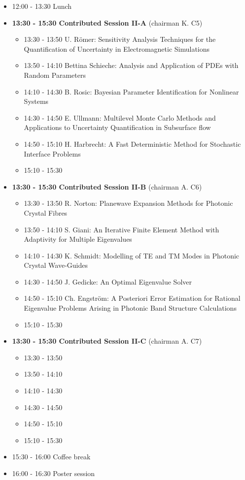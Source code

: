 \documentclass[10pt, A4]{article}%
\begin{document}
\begin{itemize}
\begin{itemize}
  \end{itemize}
  \item 12:00 - 13:30 Lunch
  \item {\bf 13:30 - 15:30 Contributed Session II-A} (chairman K. C5) 
  \begin{itemize}
    \item 13:30 - 13:50 U. R\"{o}mer: Sensitivity Analysis Techniques for the Quantification of Uncertainty in Electromagnetic Simulations
    \item 13:50 - 14:10 Bettina Schieche: Analysis and Application of PDEs with Random Parameters
    \item 14:10 - 14:30 B. Rosic: Bayesian Parameter Identification for Nonlinear Systems
    \item 14:30 - 14:50 E. Ullmann: Multilevel Monte Carlo Methods and Applications to Uncertainty Quantification in Subsurface flow
    \item 14:50 - 15:10 H. Harbrecht: A Fast Deterministic Method for Stochastic Interface Problems
    \item 15:10 - 15:30
  \end{itemize}
  \item {\bf 13:30 - 15:30 Contributed Session II-B} (chairman A. C6) 
  \begin{itemize}
    \item 13:30 - 13:50 R. Norton: Planewave Expansion Methods for Photonic Crystal Fibres
    \item 13:50 - 14:10 S. Giani: An Iterative Finite Element Method with Adaptivity for Multiple Eigenvalues
    \item 14:10 - 14:30 K. Schmidt: Modelling of TE and TM Modes in Photonic Crystal Wave-Guides
    \item 14:30 - 14:50 J. Gedicke: An Optimal Eigenvalue Solver
    \item 14:50 - 15:10 Ch. Engstr\"{o}m: A Posteriori Error Estimation for Rational Eigenvalue Problems Arising in Photonic Band Structure Calculations
    \item 15:10 - 15:30
  \end{itemize}
    \item {\bf 13:30 - 15:30 Contributed Session II-C} (chairman A. C7) 
  \begin{itemize}
    \item 13:30 - 13:50 
    \item 13:50 - 14:10 
    \item 14:10 - 14:30 
    \item 14:30 - 14:50 
    \item 14:50 - 15:10
    \item 15:10 - 15:30 
  \end{itemize}
  \item 15:30 - 16:00 Coffee break
  \item 16:00 - 16:30 Poster session
\end{itemize}
\end{document}
